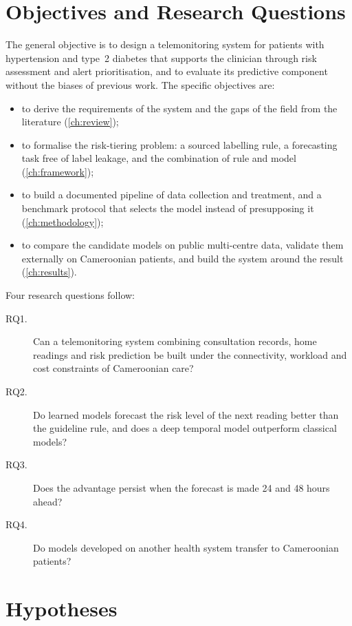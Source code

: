 \section*{Objectives and Research Questions}

The general objective is to design a telemonitoring system for patients with hypertension and type~2 diabetes that supports the clinician through risk assessment and alert prioritisation, and to evaluate its predictive component without the biases of previous work. The specific objectives are:
\begin{itemize}
  \item to derive the requirements of the system and the gaps of the field from the literature (\cref{ch:review});
  \item to formalise the risk-tiering problem: a sourced labelling rule, a forecasting task free of label leakage, and the combination of rule and model (\cref{ch:framework});
  \item to build a documented pipeline of data collection and treatment, and a benchmark protocol that selects the model instead of presupposing it (\cref{ch:methodology});
  \item to compare the candidate models on public multi-centre data, validate them externally on Cameroonian patients, and build the system around the result (\cref{ch:results}).
\end{itemize}

Four research questions follow:
\begin{description}
  \item[RQ1.] Can a telemonitoring system combining consultation records, home readings and risk prediction be built under the connectivity, workload and cost constraints of Cameroonian care?
  \item[RQ2.] Do learned models forecast the risk level of the next reading better than the guideline rule, and does a deep temporal model outperform classical models?
  \item[RQ3.] Does the advantage persist when the forecast is made 24 and 48 hours ahead?
  \item[RQ4.] Do models developed on another health system transfer to Cameroonian patients?
\end{description}

\section*{Hypotheses}

